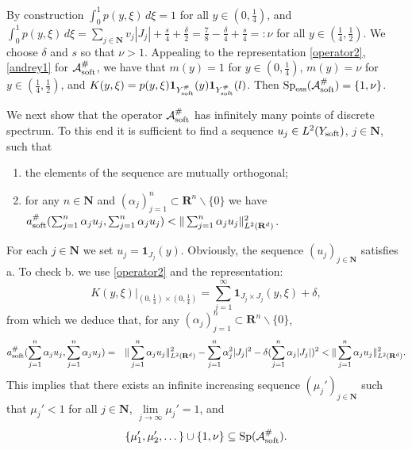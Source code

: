 \documentclass[11pt]{article}
\newcommand\soft{{\rm soft}}
\def\RR{\R}
\newcommand{\R}{\mathbf{R}}
\def\AA{\mathcal{A}}
\DeclareMathOperator{\Sp}{Sp}
\newcommand\N{\mathbf{N}}
\theoremstyle{remark}
\begin{document}
By construction  $\int_0^1p(y,\xi)\, d\xi=1$ for all $y \in (0,\frac{1}{4})$, and $\int_0^1 p(y,\xi)\, d\xi=\sum_{j\in \N} v_j |J_j|+\frac{s}{4}  + \frac{\delta}{2} = \frac{7}{8} - \frac{\delta}{4}+ \frac{s}{4} =:\nu$   for all $y \in (\frac{1}{4},\frac{1}{2})$.   We choose   $\delta$ and  $s$   so that $\nu>1$.
Appealing to the  representation \eqref{operator2},\eqref{andrey1}  for $\AA_\soft^\# $, we have  that $m(y)=1$ for $y \in (0,\frac{1}{4})$,  $m(y)=\nu$ for $y \in (\frac{1}{4},\frac{1}{2})$, and $K(y,\xi)=p(y,\xi)\mathbf{1}_{Y_\soft^{\#}}(y)\mathbf{1}_{Y_\soft^{\#}}(l)$. Then $\Sp_{\rm ess}(\AA_\soft^\# )=\{1,\nu\}$.

 We next  show that the operator $\AA_\soft^\# $ has infinitely many points of discrete spectrum.
 To this end it is sufficient to find a sequence  $u_j \in L^2(Y_\soft )$, $j \in \N$,  such that
\begin{enumerate}
\item the elements of the sequence are mutually orthogonal;
\item  for any $n \in\mathbf{N}$ and $(\alpha_j)_{j=1}^n\subset \mathbf{R}^n\backslash \{0\}$ we have $a_\soft^\#(\sum_{j=1}^n \alpha_j u_j, \sum_{j=1}^n \alpha_ju_j)<\|\sum_{j=1}^n \alpha_j u_j \|^2_{L^2(\RR^d)}$.
\end{enumerate} 	

		

For each $j \in \mathbf{N}$ we set $u_j=\mathbf{1}_{J_j}(y)$. Obviously, the sequence $(u_j)_{j\in \mathbf{N}}$ satisfies a. To check b. we use \eqref{operator2} and the representation:
$$K(y,\xi)|_{(0,\frac{1}{4})\times (0,\frac{1}{4})  }= \sum_{j=1}^{\infty}\mathbf{1}_{J_j\times J_j} (y,\xi)+\delta , $$
 from which we deduce that, for any  $(\alpha_j)_{j=1}^n\subset \mathbf{R}^n\backslash \{0\}$,
\begin{eqnarray*}
 a_\soft^\#(\sum_{j=1}^n \alpha_ju_j, \sum_{j=1}^n \alpha_j u_j)&=&  \|\sum_{j=1}^n \alpha_j u_j \|^2_{L^2(\RR^d)}-\sum_{j=1}^n \alpha_j^2 |J_j|^2-\delta (\sum_{j=1}^n \alpha_j|J_j|)^2<  \|\sum_{j=1}^n \alpha_j u_j \|^2_{L^2(\RR^d)}.
 \end{eqnarray*}
This implies that there exists an infinite increasing sequence $(\mu_j')_{j \in \N}$ such that $\mu_j'<1$ for all $j\in\N $, $\lim\limits_{j\to\infty}\mu_j'=1$,
and
$$
\{\mu_1',\mu_2',\dots\}\cup\{1,\nu\} \subseteq \Sp  (\AA_\soft^\# ).
$$
\end{document}
